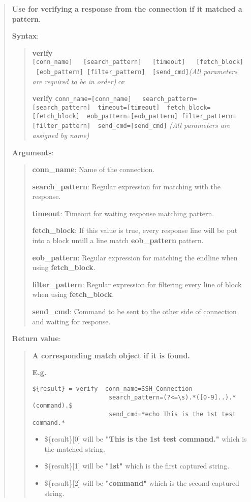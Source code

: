 \begin{quote}
\textbf{Use for verifying a response from the connection if it matched a
pattern.}

\textbf{Syntax}:

\begin{quote}
\textbf{verify}
\texttt{{[}conn\_name{]}\ \ \ {[}search\_pattern{]}\ \ \ {[}timeout{]}\ \ \ {[}fetch\_block{]}\ \ {[}eob\_pattern{]}\ {[}filter\_pattern{]}\ \ {[}send\_cmd{]}}\emph{(All
parameters are required to be in order)} or

\textbf{verify}
\texttt{conn\_name={[}conn\_name{]}\ \ \ search\_pattern={[}search\_pattern{]}\ \ timeout={[}timeout{]}\ \ fetch\_block={[}fetch\_block{]}\ \ eob\_pattern={[}eob\_pattern{]}\ filter\_pattern={[}filter\_pattern{]}\ \ send\_cmd={[}send\_cmd{]}}
\emph{(All parameters are assigned by name)}
\end{quote}

\textbf{Arguments}:

\begin{quote}
\textbf{conn\_name}: Name of the connection.

\textbf{search\_pattern}: Regular expression for matching with the
response.

\textbf{timeout}: Timeout for waiting response matching pattern.

\textbf{fetch\_block}: If this value is true, every response line will
be put into a block untill a line match \textbf{eob\_pattern} pattern.

\textbf{eob\_pattern}: Regular expression for matching the endline when
using \textbf{fetch\_block}.

\textbf{filter\_pattern}: Regular expression for filtering every line of
block when using \textbf{fetch\_block}.

\textbf{send\_cmd}: Command to be sent to the other side of connection
and waiting for response.
\end{quote}

\textbf{Return value}:

\begin{quote}
\textbf{A corresponding match object if it is found.}

\textbf{E.g.}

\begin{verbatim}
${result} = verify  conn_name=SSH_Connection
                     search_pattern=(?<=\s).*([0-9]..).*(command).$
                     send_cmd=*echo This is the 1st test command.*
\end{verbatim}

\begin{itemize}
\tightlist
\item
  \$\{result\}{[}0{]} will be \textbf{"This is the 1st test command."}
  which is the matched string.
\item
  \$\{result\}{[}1{]} will be \textbf{"1st"} which is the first captured
  string.
\item
  \$\{result\}{[}2{]} will be \textbf{"command"} which is the second
  captured string.
\end{itemize}
\end{quote}
\end{quote}

